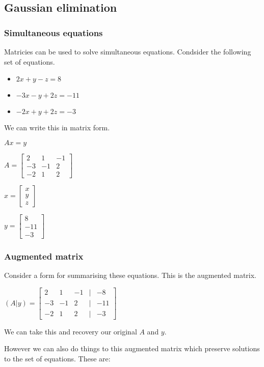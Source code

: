 
\subsection{Gaussian elimination}

\subsubsection{Simultaneous equations}

Matricies can be used to solve simultaneous equations. Condsider the following set of equations.

\begin{itemize}
\item $2x+y-z=8$
\item $-3x-y+2z=-11$
\item $-2x+y+2z=-3$
\end{itemize}

We can write this in matrix form.

$Ax=y$

$A=\begin{bmatrix}2 & 1&-1\\-3 & -1&2\\-2&1&2\end{bmatrix}$

$x=\begin{bmatrix}x \\y \\z\end{bmatrix}$

$y=\begin{bmatrix}8 \\-11 \\-3\end{bmatrix}$

\subsubsection{Augmented matrix}

Consider a form for summarising these equations. This is the augmented matrix.

$(A|y)=\begin{bmatrix}2 & 1&-1&|&-8\\-3 & -1&2&|&-11\\-2&1&2&|&-3\end{bmatrix}$

We can take this and recovery our original \(A\) and \(y\).

However we can also do things to this augmented matrix which preserve solutions to the set of equations. These are:

